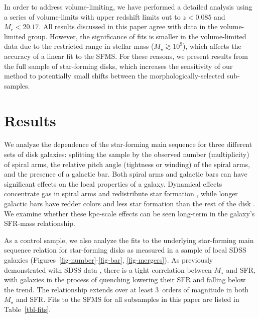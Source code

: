 \documentclass[useAMS,usenatbib]{mn2e}
\begin{document}
In order to address volume-limiting, we have performed a detailed analysis using a series of volume-limits with upper redshift limits out to $z<0.085$ and $M_r < 20.17$. All results discussed in this paper agree with data in the volume-limited group. However, the significance of fits is smaller in the volume-limited data due to the restricted range in stellar mass ($M_\star\gtrsim10^9$), which affects the accuracy of a linear fit to the SFMS. For these reasons, we present results from the full sample of star-forming disks, which increases the sensitivity of our method to potentially small shifts between the morphologically-selected sub-samples. 


\section{Results} \label{sec-results}

We analyze the dependence of the star-forming main sequence for three different sets of disk galaxies: splitting the sample by the observed number (multiplicity) of spiral arms, the relative pitch angle (tightness or winding) of the spiral arms, and the presence of a galactic bar. Both spiral arms and galactic bars can have significant effects on the local properties of a galaxy. Dynamical effects concentrate gas in spiral arms and redistribute star formation \citep{elm86,foy10}, while longer galactic bars have redder colors and less star formation than the rest of the disk \citep{hoy11,mas12a}. We examine whether these kpc-scale effects can be seen long-term in the galaxy's SFR-mass relationship. 

As a control sample, we also analyze the fits to the underlying star-forming main sequence relation for star-forming disks as measured in a sample of local SDSS galaxies (Figures~\ref{fig-number}-\ref{fig-bar}, \ref{fig-mergers}). As previously demonstrated with SDSS data \citep[e.g.,][]{bri04}, there is a tight correlation between $M_\star$ and SFR, with galaxies in the process of quenching lowering their SFR and falling below the trend. The relationship extends over at least 3~orders of magnitude in both $M_\star$ and SFR. Fits to the SFMS for all subsamples in this paper are listed in Table~\ref{tbl-fits}.
\end{document}
